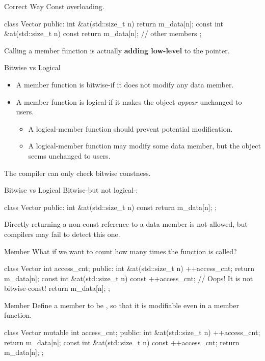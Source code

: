 \documentclass{beamer}
\begin{document}
\begin{frame}[fragile]{Correct Way}
    Const overloading.
    \begin{cpp}
class Vector {
 public:
  int &at(std::size_t n) {
    return m_data[n];
  }
  const int &at(std::size_t n) const {
    return m_data[n];
  }
  // other members
};
    \end{cpp}
    Calling a \const member function is actually \textbf{adding low-level } to the  pointer.
\end{frame}

\begin{frame}{Bitwise \const vs Logical \const}
    \begin{itemize}
        \item A member function is bitwise-\const if it does not modify any data member.
        \item A member function is logical-\const if it makes the object \textit{appear} unchanged to users.
        \begin{itemize}
            \item A logical-\const member function should prevent potential modification.
            \item A logical-\const member function may modify some data member, but the object seems unchanged to users.
        \end{itemize}
    \end{itemize}
    The compiler can only check bitwise constness.
\end{frame}

\begin{frame}[fragile]{Bitwise \const vs Logical \const}
    Bitwise-\const but not logical-\const:
    \begin{cpp}
class Vector {
 public:
  int &at(std::size_t n) const {
    return m_data[n];
  }
};
    \end{cpp}
    Directly returning a non-const reference to a data member is not allowed, but compilers may fail to detect this one.
\end{frame}

\begin{frame}[fragile]{ Member}
    What if we want to count how many times the function is called?
    \begin{cpp}
class Vector {
  int access_cnt;
 public:
  int &at(std::size_t n) {
    ++access_cnt;
    return m_data[n];
  }
  const int &at(std::size_t n) const {
    ++access_cnt;   // Oops! It is not bitwise-const!
    return m_data[n];
  }
};
    \end{cpp}
\end{frame}

\begin{frame}[fragile]{ Member}
    Define a member to be , so that it is modifiable even in a \const member function.
    \begin{cpp}
class Vector {
  mutable int access_cnt;
 public:
  int &at(std::size_t n) {
    ++access_cnt;
    return m_data[n];
  }
  const int &at(std::size_t n) const {
    ++access_cnt;
    return m_data[n];
  }
};
    \end{cpp}
\end{frame}
\end{document}
